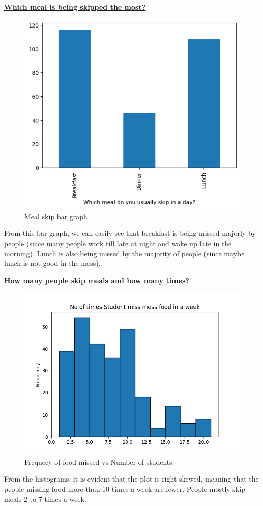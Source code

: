 \documentclass{article}
\begin{document}
\centerline{\underline{\bfseries{Which meal is being skipped the most?}}}
\begin{figure}[H]
    \centering
    \includegraphics[scale = 0.7]{bar_timing_skip.png}
    \caption{Meal skip bar graph}
    \label{fig:Normality}
\end{figure}
From this bar graph, we can easily see that breakfast is being missed majorly by people (since many people work till late at night and wake up late in the morning). Lunch is also being missed by the majority of people (since maybe lunch is not good in the mess).\\

\centerline{\underline{\bfseries{How many people skip meals and how many times?}}}
\begin{figure}[H]
    \centering
    \includegraphics[scale = 0.7]{histogram_meal_skip.png}
    \caption{Frequecy of food missed vs Number of students}  
    \label{Normality_plot}
\end{figure}
From the histograms, it is evident that the plot is right-skewed, meaning that the people missing food more than 10 times a week are fewer. People mostly skip meals 2 to 7 times a week.
\pagebreak
\end{document}
